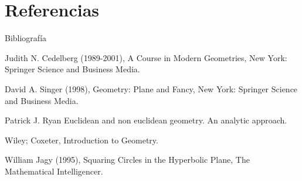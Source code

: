 \documentclass[compress]{beamer}
\begin{document}
\section{Referencias}
\begin{frame}{Bibliografía}
\begin{thebibliography}{9}

  Judith N. Cedelberg (1989-2001),
  A Course in Modern Geometries,
  New York: Springer Science and Business Media.

  David A. Singer (1998),
  Geometry: Plane and Fancy,
  New York: Springer Science and Business Media.

  Patrick J. Ryan
  Euclidean and non euclidean geometry. An analytic approach.

  Wiley; Coxeter,
  Introduction to Geometry.

  William Jagy (1995),
  Squaring Circles in the Hyperbolic Plane,
  The Mathematical Intelligencer.
  
\end{thebibliography}
\end{frame}
\end{document}
